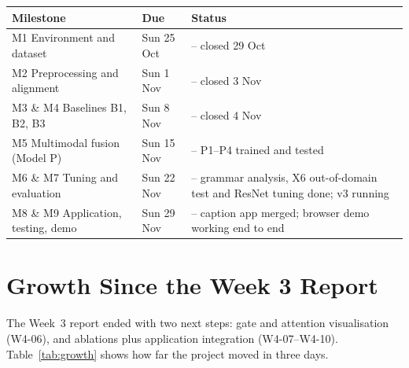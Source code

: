 \documentclass[11pt,a4paper]{article}
\begin{document}
{\small
{}
\begin{tabularx}{\textwidth}{@{}XL{1.9cm}L{7.4cm}@{}}
\toprule
{}\sffamily\bfseries Milestone & \sffamily\bfseries Due & \sffamily\bfseries Status \\
\midrule
M1 Environment and dataset & Sun 25 Oct & \done{} -- closed 29 Oct \\
M2 Preprocessing and alignment & Sun 1 Nov & \done{} -- closed 3 Nov \\
M3 \& M4 Baselines B1, B2, B3 & Sun 8 Nov & \done{} -- closed 4 Nov \\
M5 Multimodal fusion (Model P) & Sun 15 Nov & \done{} -- P1--P4 trained and tested \\
M6 \& M7 Tuning and evaluation & Sun 22 Nov & \inprog{} -- grammar analysis, X6 out-of-domain test and ResNet tuning done; v3 running \\
M8 \& M9 Application, testing, demo & Sun 29 Nov & \inprog{} -- caption app merged; browser demo working end to end \\
\bottomrule
\end{tabularx}
}

\section{Growth Since the Week 3 Report}
\label{sec:growth}
The Week~3 report ended with two next steps: gate and attention visualisation (W4-06), and
ablations plus application integration (W4-07--W4-10). Table~\ref{tab:growth} shows how far the
project moved in three days.
\end{document}
